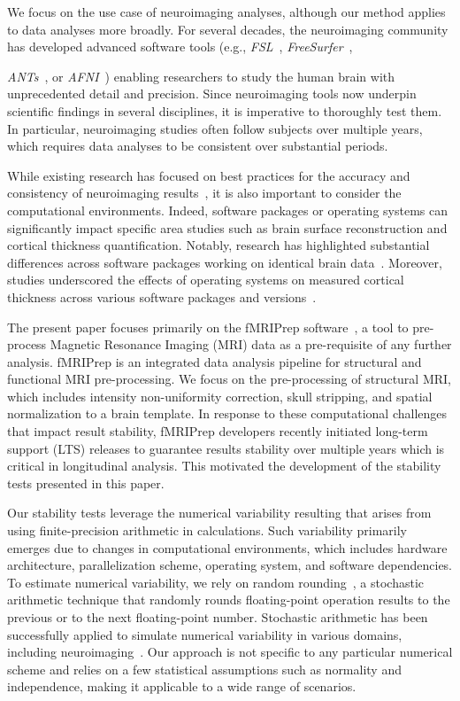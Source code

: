\documentclass[lettersize,journal]{IEEEtran}
\begin{document}
We focus on the use case of neuroimaging analyses, although our method applies to data analyses more broadly. For several decades, the neuroimaging community has developed advanced software tools (e.g., \emph{FSL}~\cite{jenkinson2012fsl}, \emph{FreeSurfer}~\cite{fischl2012freesurfer}, {\emph{ANTs}~\cite{avants2009advanced}, or \emph{AFNI}~\cite{COX1996162}) enabling researchers to study the human brain with unprecedented detail and precision. Since neuroimaging tools now underpin scientific findings in several disciplines, it is imperative to thoroughly test them. In particular, neuroimaging studies often follow subjects over multiple years, which requires data analyses to be consistent over substantial periods.

While existing research has focused on best practices for the accuracy and consistency of neuroimaging results~\cite{tustison2013instrumentation}, it is also important to consider the computational environments. Indeed, software packages or operating systems can significantly impact specific area studies such as brain surface reconstruction and cortical thickness quantification. Notably, research has highlighted substantial differences across software packages working on identical brain data~\cite{mikhael2019controlled}. Moreover, studies underscored the effects of operating systems on measured cortical thickness across various software packages and versions~\cite{glatard2015reproducibility}.

The present paper focuses primarily on the fMRIPrep software~\cite{esteban2019fmriprep}, a tool to pre-process Magnetic Resonance Imaging (MRI) data as a pre-requisite of any further analysis. fMRIPrep is an integrated data analysis pipeline for structural and functional MRI pre-processing. We focus on the pre-processing of structural MRI, which includes intensity non-uniformity correction, skull stripping, and spatial normalization to a brain template. In response to these computational challenges that impact result stability, fMRIPrep developers recently initiated long-term support (LTS) releases to guarantee results stability over multiple years which is critical in longitudinal analysis. This motivated the development of the stability tests presented in this paper.

Our stability tests leverage the numerical variability resulting that arises from using finite-precision arithmetic in calculations. Such variability primarily emerges due to changes in computational environments, which includes hardware architecture, parallelization scheme, operating system, and software dependencies. To estimate numerical variability, we rely on random rounding~\cite{forsythe1959reprint}, a stochastic arithmetic technique that randomly rounds floating-point operation results to the previous or to the next floating-point number. Stochastic arithmetic has been successfully applied to simulate numerical variability in various domains, including neuroimaging~\cite{salari2021accurate,kiar2021numerical}. Our approach is not specific to any particular numerical scheme and relies on a few statistical assumptions such as normality and independence, making it applicable to a wide range of scenarios.

}
\end{document}
